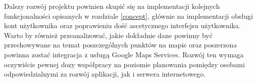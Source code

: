 \documentclass[polish,polish,a4paper,12pt]{article}
\let\sectioncmd\section
\renewcommand{\section}{\clearpage\sectioncmd}
\begin{document}
Dalszy rozwój projektu powinien skupić się na implementacji kolejnych funkcjonalności opisanych w rozdziale \ref{concept}, głównie na implementacji obsługi kont użytkownika oraz poprawieniu dość ascetycznego interfejsu użytkownika. Warto by również przeanalizować, jakie dokładnie dane powinny być przechowywane na temat poszczególnych punktów na mapie oraz poszerzona powinna zostać integracja z usługą Google Maps Services. Rozwój ten wymaga oczywiście pewnej dozy współpracy na poziomie planowania pomiędzy osobami odpowiedzialnymi za rozwój aplikacji, jak i serwera internetowego.

\printbibliography[heading=bibintoc,title={Literatura}]

\renewcommand{\section}{\sectioncmd}
\clearpage

\listoffigures

\listoflistings
\end{document}
